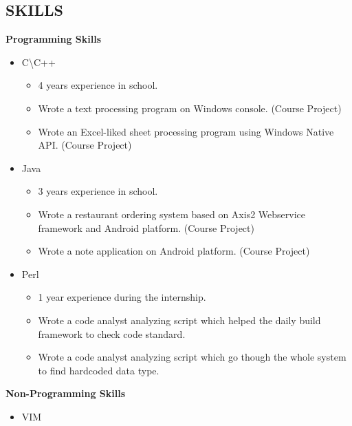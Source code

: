 \documentclass[margin]{res}
\begin{document}
\begin{resume}
\section{SKILLS}
{\bf Programming Skills}
\begin{itemize}
\item C\textbackslash C++
\begin{itemize}
\item 4 years experience in school.
\item Wrote a text processing program on Windows console. (Course Project)
\item Wrote an Excel-liked sheet processing program using Windows Native API. (Course Project)
\end{itemize}
\item Java
\begin{itemize}
\item 3 years experience in school.
\item Wrote a restaurant ordering system based on Axis2 Webservice framework and Android platform. (Course Project)
\item Wrote a note application on Android platform. (Course Project)
\end{itemize}
\item Perl
\begin{itemize}
\item 1 year experience during the internship.
\item Wrote a code analyst analyzing script which helped the daily build framework to check code standard.
\item Wrote a code analyst analyzing script which go though the whole system to find hardcoded data type.
\end{itemize}
\end{itemize}
{\bf Non-Programming Skills}
\begin{itemize}
\item VIM
\end{itemize}


\end{resume}
\end{document}
